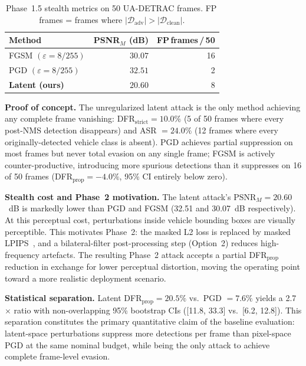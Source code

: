 \documentclass[12pt,a4paper]{report}
\begin{document}
\begin{table}[htbp]
  \centering
  \caption{Phase~1.5 stealth metrics on 50 UA-DETRAC frames.
           FP\,frames = frames where $|\mathcal{D}_{\text{adv}}|>|\mathcal{D}_{\text{clean}}|$.}
  \label{tab:phase15_stealth}
  \small
  \begin{tabular}{@{}lrr@{}}
    \toprule
    \textbf{Method} & \textbf{PSNR$_M$ (dB)} & \textbf{FP\,frames\,/\,50} \\
    \midrule
    FGSM $(\varepsilon{=}8/255)$   & $30.07$ & 16 \\
    PGD  $(\varepsilon{=}8/255)$    & $32.51$ & 2  \\
    \textbf{Latent (ours)} & $\mathbf{20.60}$ & 8  \\
    \bottomrule
  \end{tabular}
\end{table}

\textbf{Proof of concept.}
The unregularized latent attack is the only method achieving any complete
frame vanishing: DFR$_{\text{strict}} = 10.0\%$ (5 of 50 frames where every
post-NMS detection disappears) and ASR $= 24.0\%$ (12 frames where every
originally-detected vehicle class is absent). PGD achieves partial suppression
on most frames but never total evasion on any single frame; FGSM is actively
counter-productive, introducing more spurious detections than it suppresses on
16 of 50 frames (DFR$_{\text{prop}} = -4.0\%$, 95\% CI entirely below zero).

\textbf{Stealth cost and Phase~2 motivation.}
The latent attack's $\text{PSNR}_M = 20.60$~dB is markedly lower than PGD and
FGSM (32.51 and 30.07~dB respectively). At this perceptual cost, perturbations
inside vehicle bounding boxes are visually perceptible. This motivates Phase~2:
the masked L2 loss is replaced by masked LPIPS~\cite{zhang2018unreasonable}, and a
bilateral-filter post-processing step (Option~2) reduces high-frequency
artefacts. The resulting Phase~2 attack accepts a partial DFR$_{\text{prop}}$
reduction in exchange for lower perceptual distortion, moving the operating
point toward a more realistic deployment scenario.

\textbf{Statistical separation.}
Latent DFR$_{\text{prop}} = 20.5\%$ vs.\ PGD $= 7.6\%$ yields a 2.7$\times$
ratio with non-overlapping 95\% bootstrap CIs ([11.8, 33.3] vs.\ [6.2, 12.8]). This
separation constitutes the primary quantitative claim of the baseline
evaluation: latent-space perturbations suppress more detections per frame than
pixel-space PGD at the same nominal budget, while being the only attack to
achieve complete frame-level evasion.
\end{document}
